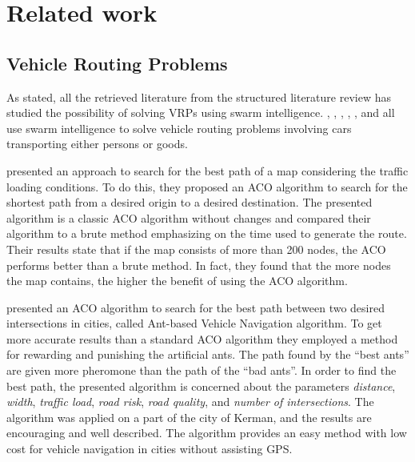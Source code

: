 \section{Related work}
\label{sec:relatedWork}



\subsection{Vehicle Routing Problems}
\label{subsec:relatedWorkVRP}

As stated, all the retrieved literature from the structured literature review has studied the possibility of solving VRPs using swarm intelligence. \citet{hsiao04}, \citet{salehi-nezhad07}, \citet{tripathi09}, \citet{dias14}, \citet{salehinejad10}, and \citet{sedighpour14} all use swarm intelligence to solve vehicle routing problems involving cars transporting either persons or goods.

\citet{hsiao04} presented an approach to search for the best path of a map considering the traffic loading conditions. To do this, they proposed an ACO algorithm to search for the shortest path from a desired origin to a desired destination. The presented algorithm is a classic ACO algorithm without changes and compared their algorithm to a brute method emphasizing on the time used to generate the route. Their results state that if the map consists of more than 200 nodes, the ACO performs better than a brute method. In fact, they found that the more nodes the map contains, the higher the benefit of using the ACO algorithm. 

\citet{salehi-nezhad07} presented an ACO algorithm to search for the best path between two desired intersections in cities, called Ant-based Vehicle Navigation algorithm. To get more accurate results than a standard ACO algorithm they employed a method for rewarding and punishing the artificial ants. The path found by the ``best ants'' are given more pheromone than the path of the ``bad ants''. In order to find the best path, the presented algorithm is concerned about the parameters \textit{distance}, \textit{width}, \textit{traffic load}, \textit{road risk}, \textit{road quality}, and \textit{number of intersections}. The algorithm was applied on a part of the city of Kerman, and the results are encouraging and well described. The algorithm provides an easy method with low cost for vehicle navigation in cities without assisting GPS.

